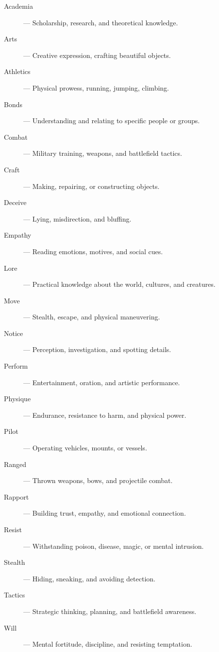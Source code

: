 \begin{description}
  \item[Academia]  — Scholarship, research, and theoretical knowledge.
  \item[Arts]  — Creative expression, crafting beautiful objects.
  \item[Athletics]  — Physical prowess, running, jumping, climbing.
  \item[Bonds]  — Understanding and relating to specific people or groups.
  \item[Combat]  — Military training, weapons, and battlefield tactics.
  \item[Craft]  — Making, repairing, or constructing objects.
  \item[Deceive]  — Lying, misdirection, and bluffing.
  \item[Empathy]  — Reading emotions, motives, and social cues.
  \item[Lore]  — Practical knowledge about the world, cultures, and creatures.
  \item[Move]  — Stealth, escape, and physical maneuvering.
  \item[Notice]  — Perception, investigation, and spotting details.
  \item[Perform]  — Entertainment, oration, and artistic performance.
  \item[Physique]  — Endurance, resistance to harm, and physical power.
  \item[Pilot]  — Operating vehicles, mounts, or vessels.
  \item[Ranged]  — Thrown weapons, bows, and projectile combat.
  \item[Rapport]  — Building trust, empathy, and emotional connection.
  \item[Resist]  — Withstanding poison, disease, magic, or mental intrusion.
  \item[Stealth]  — Hiding, sneaking, and avoiding detection.
  \item[Tactics]  — Strategic thinking, planning, and battlefield awareness.
  \item[Will]  — Mental fortitude, discipline, and resisting temptation.
\end{description}

